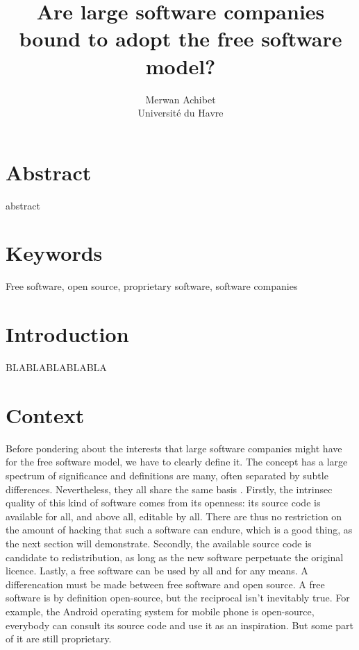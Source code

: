 \documentclass[12pt]{article}
\title{Are large software companies bound to adopt the free software model?}
\author{Merwan Achibet\\Université du Havre}
\date{}
\begin{document}
\maketitle
\newpage

\tableofcontents
\newpage

\section*{Abstract}

abstract

\section*{Keywords}

Free software, open source, proprietary software, software companies

\newpage

\section*{Introduction}

BLABLABLABLABLA

\section{Context}

Before pondering about the interests that large software companies
might have for the free software model, we have to clearly define
it. The concept has a large spectrum of significance and definitions
are many, often separated by subtle differences. Nevertheless, they
all share the same basis \cite{sers}. Firstly, the intrinsec quality
of this kind of software comes from its openness: its source code is
available for all, and above all, editable by all. There are thus no
restriction on the amount of hacking that such a software can endure,
which is a good thing, as the next section will demonstrate. Secondly,
the available source code is candidate to redistribution, as long as
the new software perpetuate the original licence. Lastly, a free
software can be used by all and for any means. A differencation must
be made between free software and open source. A free software is by
definition open-source, but the reciprocal isn't inevitably true. For
example, the Android operating system for mobile phone is open-source,
everybody can consult its source code and use it as an
inspiration. But some part of it are still proprietary.
\end{document}
